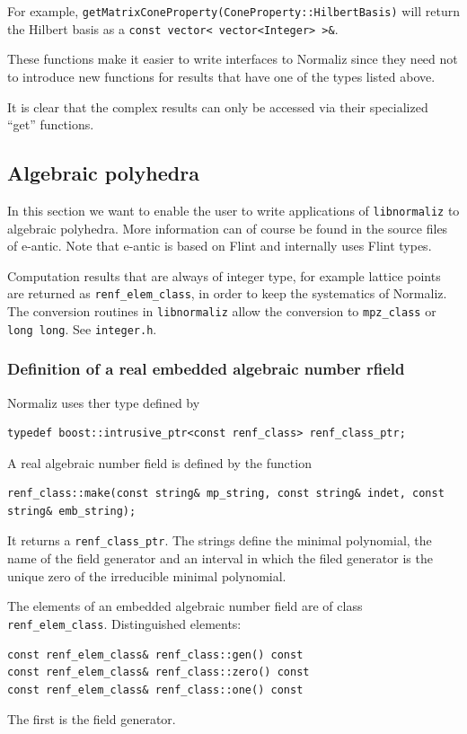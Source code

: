 \begin{small}
For example, \verb|getMatrixConeProperty(ConeProperty::HilbertBasis)| will return the Hilbert basis as a \verb|const vector< vector<Integer> >&|.

These functions make it easier to write interfaces to Normaliz since they need not to introduce new functions for results that have one of the types listed above.

It is clear that the complex results can only be accessed via their specialized ``get'' functions.

\subsection{Algebraic polyhedra}

In this section we want to enable the user to write applications of \verb*|libnormaliz| to algebraic polyhedra. More information can of course be found in the source files of e-antic. Note that e-antic is based on Flint and internally uses Flint types.

Computation results that are always of integer type, for example lattice points are returned as \verb*|renf_elem_class|, in order to keep the systematics of Normaliz. The conversion routines in \verb*|libnormaliz| allow the conversion to \verb*|mpz_class| or \verb*|long long|. See \verb*|integer.h|.

\subsubsection{Definition of a real embedded algebraic number rfield}

Normaliz uses ther type defined by
\begin{Verbatim}
typedef boost::intrusive_ptr<const renf_class> renf_class_ptr;
\end{Verbatim}
A real algebraic number field is defined by the function
\begin{Verbatim}
renf_class::make(const string& mp_string, const string& indet, const string& emb_string);
\end{Verbatim}
It returns a \verb*|renf_class_ptr|. The strings define the minimal polynomial, the name of the field generator and an interval in which the filed generator is the unique zero of the irreducible minimal polynomial.

The elements of an embedded algebraic number field are of class \verb*|renf_elem_class|. Distinguished elements:
\begin{Verbatim}
const renf_elem_class& renf_class::gen() const
const renf_elem_class& renf_class::zero() const
const renf_elem_class& renf_class::one() const
\end{Verbatim}
The first is the field generator.


\end{small}
